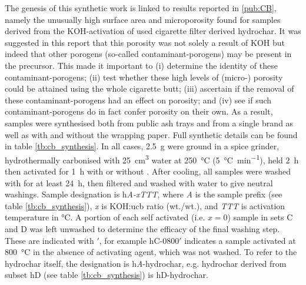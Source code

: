 The genesis of this synthetic work is linked to results reported in \ref{pub:CB}, namely the unusually high surface area and microporosity found for samples derived from the KOH-activation of used cigarette filter derived \gls{hydrochar}. It was suggested in this report that this porosity was not solely a result of KOH but indeed that other \glspl{porogen} (so-called contaminant-\glspl{porogen}) may be present in the precursor. This made it important to (i) determine the identity of these  contaminant-\glspl{porogen}; (ii) test whether these high levels of (micro-) porosity could be attained using the whole cigarette butt; (iii) ascertain if the removal of these contaminant-\glspl{porogen} had an effect on porosity; and (iv) see if such contaminant-\glspl{porogen} do in fact confer porosity on their own. As a result, samples were synthesised both from public ash trays and from a single brand as well as with and without the wrapping paper. Full synthetic details can be found in table \ref{tb:cb_synthesis}. In all cases, \qty{2.5}{\gram}  were ground in a spice grinder, hydrothermally carbonised with \qty{25}{\cm\cubed} water at \qty{250}{\degreeCelsius} (\qty{5}{\degreeCelsius\per\minute}), held \qty{2}{\hour} then activated for \qty{1}{\hour} with or without . After cooling, all samples were washed with  for at least \qty{24}{\hour}, then filtered and washed with water to give neutral washings. Sample designation is h\textit{A-xTTT}, where \textit{A} is the sample prefix (see table \ref{tb:cb_synthesis}), \textit{x} is KOH:\acrshort{ucb} ratio (wt./wt.), and \textit{TTT} is activation temperature in \unit{\degreeCelsius}. A portion of each self activated (i.e. $x = 0$) sample in sets C and D was left unwashed to determine the efficacy of the final washing step. These are indicated with $'$, for example hC-0800$'$ indicates a sample activated at \qty{800}{\degreeCelsius} in the absence of \gls{activating agent}, which was not washed. To refer to the \gls{hydrochar} itself, the designation is h\textit{A}-hydrochar, e.g. \gls{hydrochar} derived from subset hD (see table \ref{tb:cb_synthesis}) is hD-hydrochar.

